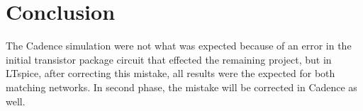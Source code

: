 \section{Conclusion}

The Cadence simulation were not what was expected because of an error in the initial transistor package circuit that effected the remaining project, but in LTspice, after correcting this mistake, all results were the expected for both matching networks. In second phase, the mistake will be corrected in Cadence as well.